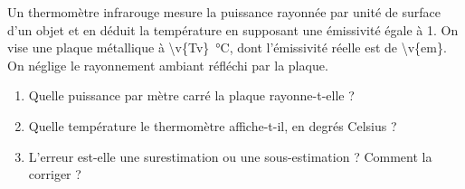 Un thermomètre infrarouge mesure la puissance rayonnée par unité de surface d'un objet et en déduit la température en supposant une émissivité égale à 1. On vise une plaque métallique à \qty{\v{Tv}}{\degreeCelsius}, dont l'émissivité réelle est de \num{\v{em}}. On néglige le rayonnement ambiant réfléchi par la plaque.

\begin{enumerate}[label=\alph*)]
    \item Quelle puissance par mètre carré la plaque rayonne-t-elle ?
    \item Quelle température le thermomètre affiche-t-il, en degrés Celsius ?
    \item L'erreur est-elle une surestimation ou une sous-estimation ? Comment la corriger ?
\end{enumerate}

